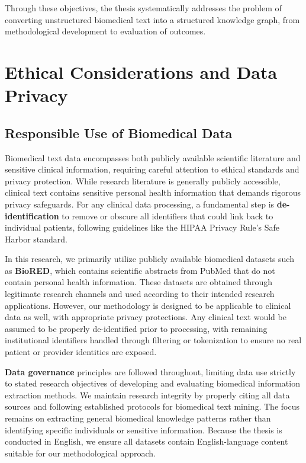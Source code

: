 Through these objectives, the thesis systematically addresses the problem of converting unstructured biomedical text into a structured knowledge graph, from methodological development to evaluation of outcomes.


\section{Ethical Considerations and Data Privacy}

\subsection{Responsible Use of Biomedical Data}

Biomedical text data encompasses both publicly available scientific literature and sensitive clinical information, requiring careful attention to ethical standards and privacy protection. While research literature is generally publicly accessible, clinical text contains sensitive personal health information that demands rigorous privacy safeguards. For any clinical data processing, a fundamental step is \textbf{de-identification} to remove or obscure all identifiers that could link back to individual patients, following guidelines like the HIPAA Privacy Rule's Safe Harbor standard.

In this research, we primarily utilize publicly available biomedical datasets such as \textbf{BioRED}, which contains scientific abstracts from PubMed that do not contain personal health information. These datasets are obtained through legitimate research channels and used according to their intended research applications. However, our methodology is designed to be applicable to clinical data as well, with appropriate privacy protections. Any clinical text would be assumed to be properly de-identified prior to processing, with remaining institutional identifiers handled through filtering or tokenization to ensure no real patient or provider identities are exposed.

\textbf{Data governance} principles are followed throughout, limiting data use strictly to stated research objectives of developing and evaluating biomedical information extraction methods. We maintain research integrity by properly citing all data sources and following established protocols for biomedical text mining. The focus remains on extracting general biomedical knowledge patterns rather than identifying specific individuals or sensitive information. Because the thesis is conducted in English, we ensure all datasets contain English-language content suitable for our methodological approach.

